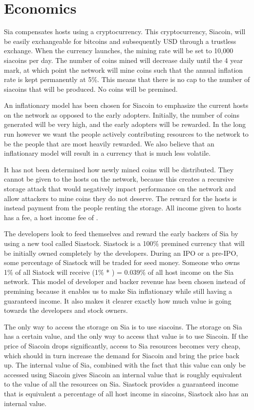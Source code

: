 \documentclass[twocolumn]{article}
\begin{document}
\section{Economics}
Sia compensates hosts using a cryptocurrency.
This cryptocurrency, Siacoin, will be easily exchangeable for bitcoins and subsequently USD through a trustless exchange.
When the currency launches, the mining rate will be set to 10,000 siacoins per day.
The number of coins mined will decrease daily until the 4 year mark, at which point the network will mine coins such that the annual inflation rate is kept permanently at 5\%.
This means that there is no cap to the number of siacoins that will be produced.
No coins will be premined.

An inflationary model has been chosen for Siacoin to emphasize the current hosts on the network as opposed to the early adopters.
Initially, the number of coins generated will be very high, and the early adopters will be rewarded.
In the long run however we want the people actively contributing resources to the network to be the people that are most heavily rewarded.
We also believe that an inflationary model will result in a currency that is much less volatile.

It has not been determined how newly mined coins will be distributed.
They cannot be given to the hosts on the network, because this creates a recursive storage attack that would negatively impact performance on the network and allow attackers to mine coins they do not deserve.
The reward for the hosts is instead payment from the people renting the storage.
All income given to hosts has a fee, a host income fee of \hostincomefee{}.

The developers look to feed themselves and reward the early backers of Sia by using a new tool called Siastock.
Siastock is a 100\% premined currency that will be initially owned completely by the developers.
During an IPO or a pre-IPO, some percentage of Siastock will be traded for seed money.
Someone who owns 1\% of all Siatock will receive (1\% * \hostincomefee{}) = 0.039\% of all host income on the Sia network.
This model of developer and backer revenue has been chosen instead of premining because it enables us to make Sia inflationary while still having a guaranteed income.
It also makes it clearer exactly how much value is going towards the developers and stock owners.

The only way to access the storage on Sia is to use siacoins.
The storage on Sia has a certain value, and the only way to access that value is to use Siacoin.
If the price of Siacoin drops significantly, access to Sia resources becomes very cheap, which should in turn increase the demand for Siacoin and bring the price back up.
The internal value of Sia, combined with the fact that this value can only be accessed using Siacoin gives Siacoin an internal value that is roughly equivalent to the value of all the resources on Sia.
Siastock provides a guaranteed income that is equivalent a percentage of all host income in siacoins, Siastock also has an internal value.
\end{document}
